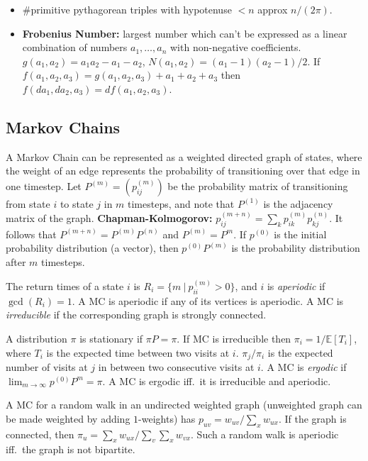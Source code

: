 \documentclass[9pt,a4paper,twocolumn,landscape,oneside]{amsart}
\begin{document}
\begin{multicols*}{3}
\begin{itemize}[leftmargin=*]
            \item \#primitive pythagorean triples with hypotenuse $<n$ approx $n/(2\pi)$.
            \item \textbf{Frobenius Number:} largest number which can't be
                expressed as a linear combination of numbers $a_1,\ldots,a_n$
                with non-negative coefficients. $g(a_1,a_2) = a_1a_2-a_1-a_2$,
                $N(a_1,a_2)=(a_1-1)(a_2-1)/2$. If $f(a_1,a_2,a_3) =
                g(a_1,a_2,a_3) + a_1+a_2+a_3$ then $f(d a_1,d a_2,a_3) = d f(a_1,a_2,a_3)$.
        \end{itemize}

        \subsection{Markov Chains}
            A Markov Chain can be represented as a weighted directed graph of
            states, where the weight of an edge represents the probability of
            transitioning over that edge in one timestep. Let $P^{(m)} = (p^{(m)}_{ij})$
            be the probability matrix of transitioning from state $i$ to state $j$
            in $m$ timesteps, and note that $P^{(1)}$ is the adjacency matrix of
            the graph. \textbf{Chapman-Kolmogorov:} $p^{(m+n)}_{ij} = \sum_{k}
            p^{(m)}_{ik} p^{(n)}_{kj}$. It follows that $P^{(m+n)} =
            P^{(m)}P^{(n)}$ and $P^{(m)} = P^m$. If $p^{(0)}$ is the initial
            probability distribution (a vector), then $p^{(0)}P^{(m)}$ is the
            probability distribution after $m$ timesteps.

            The return times of a state $i$ is $R_i = \{m\ |\ p^{(m)}_{ii} > 0 \}$,
            and $i$ is \textit{aperiodic} if $\gcd(R_i) = 1$. A MC is aperiodic if
            any of its vertices is aperiodic. A MC is \textit{irreducible} if the
            corresponding graph is strongly connected.

            A distribution $\pi$ is stationary if $\pi P = \pi$. If MC is
            irreducible then $\pi_i = 1/\mathbb{E}[T_i]$, where $T_i$ is the
            expected time between two visits at $i$. $\pi_j/\pi_i$ is the expected
            number of visits at $j$ in between two consecutive visits at $i$. A MC
            is \textit{ergodic} if $\lim_{m\to\infty} p^{(0)} P^{m} = \pi$. A MC is
            ergodic iff.\ it is irreducible and aperiodic.

            A MC for a random walk in an undirected weighted graph (unweighted
            graph can be made weighted by adding $1$-weights) has $p_{uv} =
            w_{uv}/\sum_{x} w_{ux}$. If the graph is connected, then $\pi_u =
            \sum_{x} w_{ux} / \sum_{v}\sum_{x} w_{vx}$. Such a random walk is
            aperiodic iff.\ the graph is not bipartite.


\end{multicols*}
\end{document}

